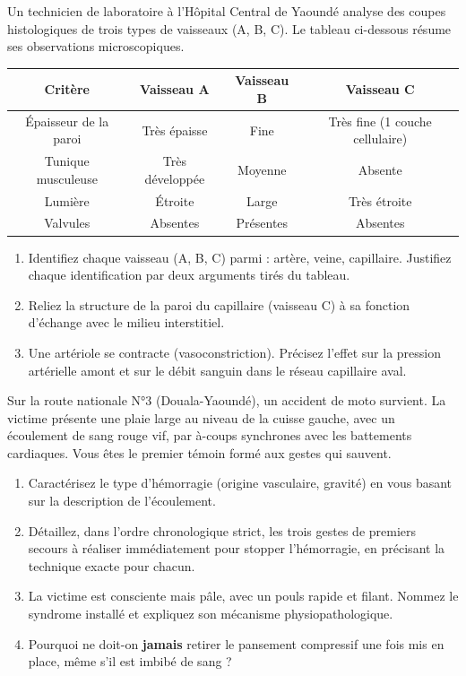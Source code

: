 \documentclass[11pt]{article}
\begin{document}
\begin{exercice}
Un technicien de laboratoire à l'Hôpital Central de Yaoundé analyse des coupes histologiques de trois types de vaisseaux (A, B, C). Le tableau ci-dessous résume ses observations microscopiques.
\begin{center}
\begin{tabular}{|c|c|c|c|}
\hline
\textbf{Critère} & \textbf{Vaisseau A} & \textbf{Vaisseau B} & \textbf{Vaisseau C} \\
\hline
Épaisseur de la paroi & Très épaisse & Fine & Très fine (1 couche cellulaire) \\
\hline
Tunique musculeuse & Très développée & Moyenne & Absente \\
\hline
Lumière & Étroite & Large & Très étroite \\
\hline
Valvules & Absentes & Présentes & Absentes \\
\hline
\end{tabular}
\end{center}
\begin{enumerate}
    \item Identifiez chaque vaisseau (A, B, C) parmi : artère, veine, capillaire. Justifiez chaque identification par deux arguments tirés du tableau.
    \item Reliez la structure de la paroi du capillaire (vaisseau C) à sa fonction d'échange avec le milieu interstitiel.
    \item Une artériole se contracte (vasoconstriction). Précisez l'effet sur la pression artérielle amont et sur le débit sanguin dans le réseau capillaire aval.
\end{enumerate}
\end{exercice}

\begin{exercice}
Sur la route nationale N°3 (Douala-Yaoundé), un accident de moto survient. La victime présente une plaie large au niveau de la cuisse gauche, avec un écoulement de sang rouge vif, par à-coups synchrones avec les battements cardiaques. Vous êtes le premier témoin formé aux gestes qui sauvent.
\begin{enumerate}
    \item Caractérisez le type d'hémorragie (origine vasculaire, gravité) en vous basant sur la description de l'écoulement.
    \item Détaillez, dans l'ordre chronologique strict, les trois gestes de premiers secours à réaliser immédiatement pour stopper l'hémorragie, en précisant la technique exacte pour chacun.
    \item La victime est consciente mais pâle, avec un pouls rapide et filant. Nommez le syndrome installé et expliquez son mécanisme physiopathologique.
    \item Pourquoi ne doit-on \textbf{jamais} retirer le pansement compressif une fois mis en place, même s'il est imbibé de sang ?
\end{enumerate}
\end{exercice}
\end{document}
